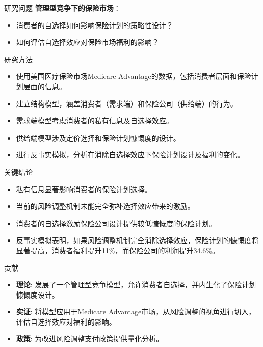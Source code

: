 \documentclass[professionalfonts, aspectratio=169]{beamer}
\begin{document}
\begin{frame}{研究问题}
  \textbf{管理型竞争下的保险市场}：
  \begin{itemize}
    \item 消费者的自选择如何影响保险计划的策略性设计？
    \item 如何评估自选择效应对保险市场福利的影响？
  \end{itemize}
\end{frame}

\begin{frame}{研究方法}
  \begin{itemize}
    \item 使用美国医疗保险市场Medicare Advantage的数据，包括消费者层面和保险计划层面的信息。
    \item 建立结构模型，涵盖消费者（需求端）和保险公司（供给端）的行为。
    \item 需求端模型考虑消费者的私有信息及自选择效应。
    \item 供给端模型涉及定价选择和保险计划慷慨度的设计。
    \item 进行反事实模拟，分析在消除自选择效应下保险计划设计及福利的变化。
  \end{itemize}
\end{frame}

\begin{frame}{关键结论}
  \begin{itemize}
    \item 私有信息显著影响消费者的保险计划选择。
    \item 当前的风险调整机制未能完全弥补选择效应带来的激励。
    \item 消费者的自选择激励保险公司设计提供较低慷慨度的保险计划。
    \item 反事实模拟表明，如果风险调整机制完全消除选择效应，保险计划的慷慨度将显著提高，消费者福利提升11\%，而保险公司的利润提升34.6\%。
  \end{itemize}
\end{frame}

\begin{frame}{贡献}
  \begin{itemize}
    \item \textbf{理论}: 发展了一个管理型竞争模型，允许消费者自选择，并内生化了保险计划慷慨度设计。
    \item \textbf{实证}: 将模型应用于Medicare Advantage市场，从风险调整的视角进行切入，评估自选择效应对福利的影响。
    \item \textbf{政策}: 为改进风险调整支付政策提供量化分析。
  \end{itemize}
\end{frame}
\end{document}
